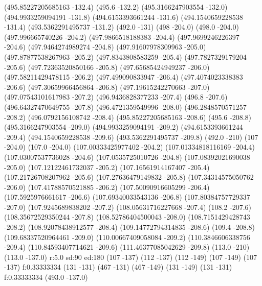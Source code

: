 {\lvec (495.85227205685163 -132.4)
\lvec (495.6 -132.2)
\lvec (495.3166247903554 -132.0)
\lvec (494.9933259094191 -131.8)
\lvec (494.6153393661244 -131.6)
\lvec (494.1540659228538 -131.4)
\lvec (493.5362291495737 -131.2)
\lvec (492.0 -131)
\move (498 -204.0)
\lvec (498.0 -204.0)
\lvec (497.996665740226 -204.2)
\lvec (497.9866518188383 -204.4)
\lvec (497.9699246226397 -204.6)
\lvec (497.9464274989274 -204.8)
\lvec (497.91607978309963 -205.0)
\lvec (497.87877538267963 -205.2)
\lvec (497.8343808583259 -205.4)
\lvec (497.7827329179204 -205.6)
\lvec (497.72363520850166 -205.8)
\lvec (497.65685424949237 -206.0)
\lvec (497.58211429478115 -206.2)
\lvec (497.499090833947 -206.4)
\lvec (497.4074023338383 -206.6)
\lvec (497.30659966456864 -206.8)
\lvec (497.19615242270663 -207.0)
\lvec (497.07543101617983 -207.2)
\lvec (496.9436828377233 -207.4)
\lvec (496.8 -207.6)
\lvec (496.64327470649755 -207.8)
\lvec (496.4721359549996 -208.0)
\lvec (496.2848570571257 -208.2)
\lvec (496.0792156108742 -208.4)
\lvec (495.85227205685163 -208.6)
\lvec (495.6 -208.8)
\lvec (495.3166247903554 -209.0)
\lvec (494.9933259094191 -209.2)
\lvec (494.6153393661244 -209.4)
\lvec (494.1540659228538 -209.6)
\lvec (493.5362291495737 -209.8)
\lvec (492.0 -210)
\move (107 -204.0)
\lvec (107.0 -204.0)
\lvec (107.00333425977402 -204.2)
\lvec (107.01334818116169 -204.4)
\lvec (107.03007537736028 -204.6)
\lvec (107.0535725010726 -204.8)
\lvec (107.08392021690038 -205.0)
\lvec (107.12122461732037 -205.2)
\lvec (107.16561914167407 -205.4)
\lvec (107.21726708207962 -205.6)
\lvec (107.27636479149832 -205.8)
\lvec (107.34314575050762 -206.0)
\lvec (107.41788570521885 -206.2)
\lvec (107.50090916605299 -206.4)
\lvec (107.5925976661617 -206.6)
\lvec (107.69340033543136 -206.8)
\lvec (107.80384757729337 -207.0)
\lvec (107.9245689838202 -207.2)
\lvec (108.05631716227668 -207.4)
\lvec (108.2 -207.6)
\lvec (108.35672529350244 -207.8)
\lvec (108.52786404500043 -208.0)
\lvec (108.7151429428743 -208.2)
\lvec (108.92078438912577 -208.4)
\lvec (109.14772794314835 -208.6)
\lvec (109.4 -208.8)
\lvec (109.68337520964461 -209.0)
\lvec (110.00667409058084 -209.2)
\lvec (110.3846606338756 -209.4)
\lvec (110.84593407714621 -209.6)
\lvec (111.46377085042629 -209.8)
\lvec (113.0 -210)
\move(113.0 -137.0)
\larc r:5.0 sd:90 ed:180
\move (107 -137)
\lvec (112 -137)
\lvec (112 -149)
\lvec (107 -149)
\lvec (107 -137)
\lfill f:0.33333334
\move (131 -131)
\lvec (467 -131)
\lvec (467 -149)
\lvec (131 -149)
\lvec (131 -131)
\lfill f:0.33333334
\move(493.0 -137.0)
}
